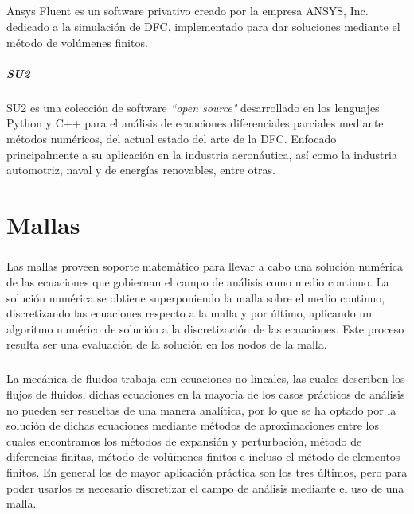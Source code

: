 \documentclass[letterpaper, openright, 12pt]{book}
\begin{document}
				\paragraph*{}
					Ansys Fluent es un software privativo creado por la empresa ANSYS, Inc. dedicado a la simulación de DFC, implementado para dar soluciones mediante el método de volúmenes finitos.
					
				\paragraph*{SU2}
				\paragraph*{}
					SU2 es una colección de software \textit{``open source"} desarrollado en los lenguajes Python y C++ para el análisis de ecuaciones diferenciales parciales mediante métodos numéricos, del actual estado del arte de la DFC. Enfocado principalmente a su aplicación en la industria aeronáutica, así como la industria automotriz, naval y de energías renovables, entre otras.\cite{SU2}
				
	
				
	
	
					
	\chapter{Mallas}
	\paragraph*{}
		Las mallas proveen soporte matemático para llevar a cabo una solución numérica de las ecuaciones que gobiernan el campo de análisis como medio continuo. La solución numérica se obtiene superponiendo la malla sobre el medio continuo, discretizando las ecuaciones respecto a la malla y por último, aplicando un algoritmo numérico de solución a la discretización de las ecuaciones. Este proceso resulta ser una evaluación de la solución en los nodos de la malla.
	\paragraph*{}
		La mecánica de fluidos trabaja con ecuaciones no lineales, las cuales describen los flujos de fluidos, dichas ecuaciones en la mayoría de los casos prácticos de análisis no pueden ser resueltas de una manera analítica, por lo que se ha optado por la solución de dichas ecuaciones mediante métodos de aproximaciones entre los cuales encontramos los métodos de expansión y perturbación, método de diferencias finitas, método de volúmenes finitos e incluso el método de elementos finitos. En general los de mayor aplicación práctica son los tres últimos, pero para poder usarlos es necesario discretizar el campo de análisis mediante el uso de una malla.\cite{thompsonhandbook}
\end{document}
